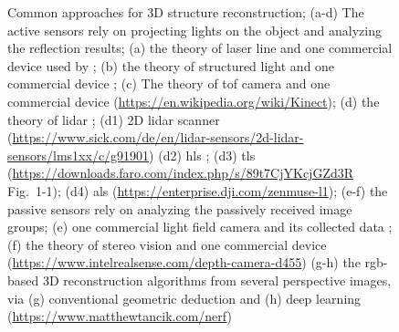 \begin{figure}[htb!]
  \begin{center}
  \end{center}
  \caption[Common approaches for 3D structure reconstruction]{
    Common approaches for 3D structure reconstruction; (a-d) The active sensors rely on projecting lights on the object and analyzing the reflection results; (a) the theory of laser line \citep[Fig.~1]{zhou_real-time_2020} and one commercial device used by \citet[Fig.~2]{schunck_pheno4d_2021}; (b) the theory of structured light \citep[Fig.~4]{paturkar_making_2021} and one commercial device \citep[Fig.~1]{duc_combined_2015}; (c) The theory of \gls{tof} camera \citep[Fig.~2.1]{jamtsho_geometric_2010} and one commercial device (\url{https://en.wikipedia.org/wiki/Kinect}); (d) the theory of \acrfull{lidar} \citep[Fig.~4]{khomsin_analysis_2019}; (d1) 2D lidar scanner (\url{https://www.sick.com/de/en/lidar-sensors/2d-lidar-sensors/lms1xx/c/g91901}) (d2) \acrfull{hls} \citep[Fig.~2b]{ameen_evaluation_2018}; (d3) \acrfull{tls} (\url{https://downloads.faro.com/index.php/s/89t7CjYKcjGZd3R} Fig.~1-1); (d4) \acrfull{als} (\url{https://enterprise.dji.com/zenmuse-l1}); (e-f) the passive sensors rely on analyzing the passively received image groups; (e) one commercial light field camera and its collected data \citep[Fig.~1\&6]{schima_imagine_2016}; (f) the theory of stereo vision \citep[Fig.~1]{kim_3d_2003} and one commercial device (\url{https://www.intelrealsense.com/depth-camera-d455}) (g-h) the \gls{rgb}-based 3D reconstruction algorithms from several perspective images, via (g) conventional geometric deduction \citep[Fig.~6]{shalma_review_2023} and (h) deep learning (\url{https://www.matthewtancik.com/nerf})
  }
  \label{fig:int2}
\end{figure}